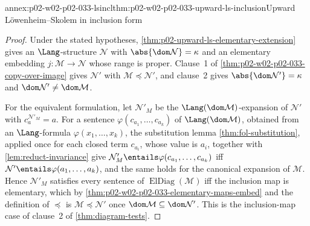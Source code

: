 \begin{annexitem}{annex:p02-w02-p02-033-lsincl}{thm:p02-w02-p02-033-upward-ls-inclusion}{Upward L\"owenheim--Skolem in inclusion form}
\begin{proof}
Under the stated hypotheses,
\cref{thm:p02-upward-ls-elementary-extension} gives an
\(\Lang\)-structure \(\mathcal N\) with \(\abs{\dom\mathcal N}=\kappa\) and
an elementary embedding \(j:\mathcal M\to\mathcal N\) whose range is
proper.  Clause~1 of \cref{thm:p02-w02-p02-033-copy-over-image} gives
\(\mathcal N'\) with \(\mathcal M\preccurlyeq\mathcal N'\), and clause~2
gives \(\abs{\dom\mathcal N'}=\kappa\) and \(\dom\mathcal N'\ne\dom\mathcal
M\).

For the equivalent formulation, let \(\mathcal N'_{M}\) be the
\(\Lang(\dom\mathcal M)\)-expansion of \(\mathcal N'\) with
\(c_a^{\mathcal N'_M}=a\).  For a sentence
\(\varphi(c_{a_1},\ldots,c_{a_k})\) of \(\Lang(\dom\mathcal M)\), obtained
from an \(\Lang\)-formula \(\varphi(x_1,\ldots,x_k)\), the substitution
lemma \cref{thm:fol-substitution}, applied once for each closed term
\(c_{a_i}\), whose value is \(a_i\), together with
\cref{lem:reduct-invariance} give
\(\mathcal N'_M\entails\varphi(c_{a_1},\ldots,c_{a_k})\) iff
\(\mathcal N'\entails\varphi(a_1,\ldots,a_k)\), and the same holds for the
canonical expansion of \(\mathcal M\).  Hence \(\mathcal N'_M\) satisfies
every sentence of \(\operatorname{ElDiag}(\mathcal M)\) iff the inclusion
map is elementary, which by
\cref{thm:p02-w02-p02-033-elementary-maps-embed} and the definition of
\(\preccurlyeq\) is \(\mathcal M\preccurlyeq\mathcal N'\) once
\(\dom\mathcal M\subseteq\dom\mathcal N'\).  This is the inclusion-map case
of clause~2 of \cref{thm:diagram-tests}.
\end{proof}
\end{annexitem}

